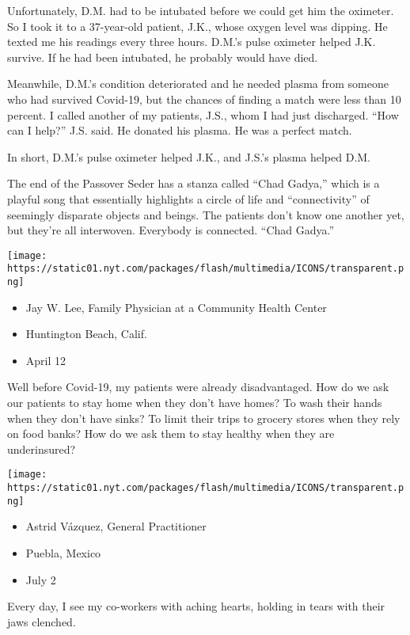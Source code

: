 Unfortunately, D.M. had to be intubated before we could get him the
oximeter. So I took it to a 37-year-old patient, J.K., whose oxygen
level was dipping. He texted me his readings every three hours. D.M.'s
pulse oximeter helped J.K. survive. If he had been intubated, he
probably would have died.

Meanwhile, D.M.'s condition deteriorated and he needed plasma from
someone who had survived Covid-19, but the chances of finding a match
were less than 10 percent. I called another of my patients, J.S., whom I
had just discharged. ``How can I help?'' J.S. said. He donated his
plasma. He was a perfect match.

In short, D.M.'s pulse oximeter helped J.K., and J.S.'s plasma helped
D.M.

The end of the Passover Seder has a stanza called ``Chad Gadya,'' which
is a playful song that essentially highlights a circle of life and
``connectivity'' of seemingly disparate objects and beings. The patients
don't know one another yet, but they're all interwoven. Everybody is
connected. ``Chad Gadya.''

\texttt{[image: https://static01.nyt.com/packages/flash/multimedia/ICONS/transparent.png]}

\begin{itemize}
\tightlist
\item
  Jay W. Lee, Family Physician at a Community Health Center
\item
  Huntington Beach, Calif.
\item
  April 12
\end{itemize}

Well before Covid-19, my patients were already disadvantaged. How do we
ask our patients to stay home when they don't have homes? To wash their
hands when they don't have sinks? To limit their trips to grocery stores
when they rely on food banks? How do we ask them to stay healthy when
they are underinsured?

\texttt{[image: https://static01.nyt.com/packages/flash/multimedia/ICONS/transparent.png]}

\begin{itemize}
\tightlist
\item
  Astrid Vázquez, General Practitioner
\item
  Puebla, Mexico
\item
  July 2
\end{itemize}

Every day, I see my co-workers with aching hearts, holding in tears with
their jaws clenched.

